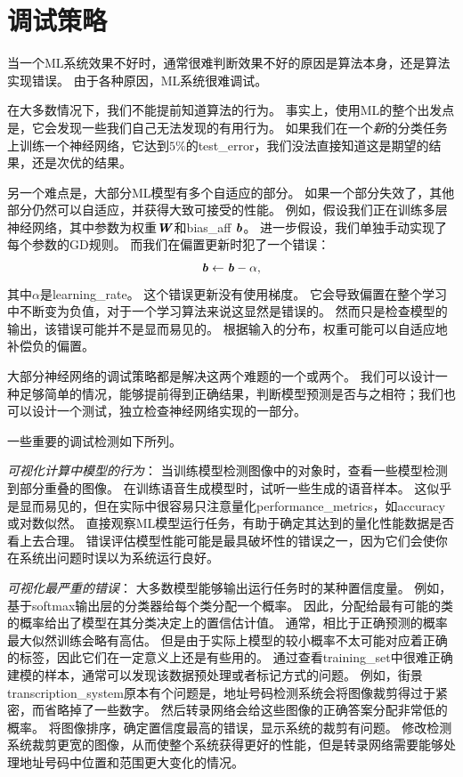 \section{调试策略}
\label{sec:debugging_strategies}
当一个\gls{ML}系统效果不好时，通常很难判断效果不好的原因是算法本身，还是算法实现错误。
由于各种原因，\gls{ML}系统很难调试。


在大多数情况下，我们不能提前知道算法的行为。
事实上，使用\gls{ML}的整个出发点是，它会发现一些我们自己无法发现的有用行为。
如果我们在一个\emph{新}的分类任务上训练一个神经网络，它达到$5\%$的\gls{test_error}，我们没法直接知道这是期望的结果，还是次优的结果。


另一个难点是，大部分\gls{ML}模型有多个自适应的部分。
如果一个部分失效了，其他部分仍然可以自适应，并获得大致可接受的性能。
例如，假设我们正在训练多层神经网络，其中参数为权重$\boldsymbol{\mathit{W}}$和\gls{bias_aff} $\boldsymbol{\mathit{b}}$。
进一步假设，我们单独手动实现了每个参数的\gls{GD}规则。
而我们在偏置更新时犯了一个错误：
\begin{equation}
	\boldsymbol{\mathit{b}} \leftarrow \boldsymbol{\mathit{b}} - \alpha,
\end{equation}
其中$\alpha$是\gls{learning_rate}。
这个错误更新没有使用梯度。
它会导致偏置在整个学习中不断变为负值，对于一个学习算法来说这显然是错误的。 
然而只是检查模型的输出，该错误可能并不是显而易见的。
根据输入的分布，权重可能可以自适应地补偿负的偏置。


大部分神经网络的调试策略都是解决这两个难题的一个或两个。
我们可以设计一种足够简单的情况，能够提前得到正确结果，判断模型预测是否与之相符；我们也可以设计一个测试，独立检查神经网络实现的一部分。%


一些重要的调试检测如下所列。

\emph{可视化计算中模型的行为}：%
当训练模型检测图像中的对象时，查看一些模型检测到部分重叠的图像。
在训练语音生成模型时，试听一些生成的语音样本。
这似乎是显而易见的，但在实际中很容易只注意量化\gls{performance_metrics}，如\gls{accuracy}或对数似然。
直接观察\gls{ML}模型运行任务，有助于确定其达到的量化性能数据是否看上去合理。
错误评估模型性能可能是最具破坏性的错误之一，因为它们会使你在系统出问题时误以为系统运行良好。


\emph{可视化最严重的错误}：
大多数模型能够输出运行任务时的某种置信度量。
例如，基于\gls{softmax}输出层的分类器给每个类分配一个概率。
因此，分配给最有可能的类的概率给出了模型在其分类决定上的置信估计值。
通常，相比于正确预测的概率最大似然训练会略有高估。
但是由于实际上模型的较小概率不太可能对应着正确的标签，因此它们在一定意义上还是有些用的。
通过查看\gls{training_set}中很难正确建模的样本，通常可以发现该数据预处理或者标记方式的问题。
例如，街景\gls{transcription_system}原本有个问题是，地址号码检测系统会将图像裁剪得过于紧密，而省略掉了一些数字。
然后转录网络会给这些图像的正确答案分配非常低的概率。
将图像排序，确定置信度最高的错误，显示系统的裁剪有问题。
修改检测系统裁剪更宽的图像，从而使整个系统获得更好的性能，但是转录网络需要能够处理地址号码中位置和范围更大变化的情况。



